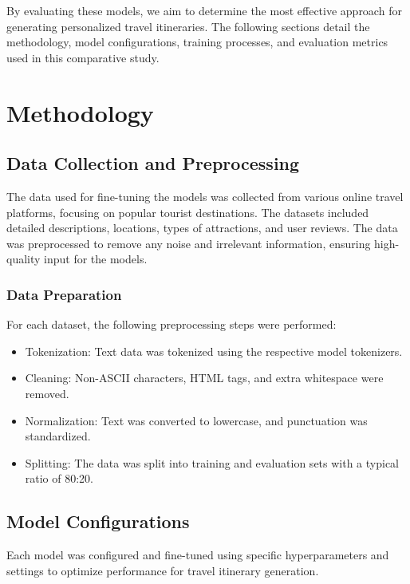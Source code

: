 \documentclass[conference]{IEEEtran}
\begin{document}
By evaluating these models, we aim to determine the most effective approach for generating personalized travel itineraries. The following sections detail the methodology, model configurations, training processes, and evaluation metrics used in this comparative study.



\section{Methodology}

\subsection{Data Collection and Preprocessing}

The data used for fine-tuning the models was collected from various online travel platforms, focusing on popular tourist destinations. The datasets included detailed descriptions, locations, types of attractions, and user reviews. The data was preprocessed to remove any noise and irrelevant information, ensuring high-quality input for the models.

\subsubsection{Data Preparation}

For each dataset, the following preprocessing steps were performed:
\begin{itemize}
    \item Tokenization: Text data was tokenized using the respective model tokenizers.
    \item Cleaning: Non-ASCII characters, HTML tags, and extra whitespace were removed.
    \item Normalization: Text was converted to lowercase, and punctuation was standardized.
    \item Splitting: The data was split into training and evaluation sets with a typical ratio of 80:20.
\end{itemize}

\subsection{Model Configurations}

Each model was configured and fine-tuned using specific hyperparameters and settings to optimize performance for travel itinerary generation.
\end{document}
